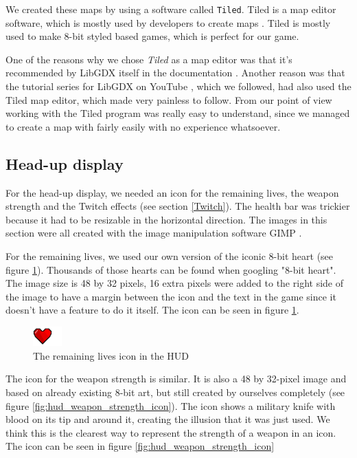 \documentclass[12p]{article}
\begin{document}
We created these maps by using a software called \texttt{Tiled}. Tiled is a map editor software, which is mostly used by developers to create maps \cite{TiledMapEditor}. Tiled is mostly used to make 8-bit styled based games, which is perfect for our game.

One of the reasons why we chose \emph{Tiled} as a map editor was that it's recommended by LibGDX itself in the documentation \cite{TileMaps}. Another reason was that the tutorial series for LibGDX on YouTube \cite{BrentAureliSuperMarioBros}, which we followed, had also used the Tiled map editor, which made very painless to follow. From our point of view working with the Tiled program was really easy to understand, since we managed to create a map with fairly easily with no experience whatsoever.

\subsection{Head-up display}

For the head-up display, we needed an icon for the remaining lives, the weapon strength and the Twitch effects (see section \ref{Twitch}). The health bar was trickier because it had to be resizable in the horizontal direction. The images in this section were all created with the image manipulation software GIMP \cite{GIMP}.

For the remaining lives, we used our own version of the iconic 8-bit heart (see figure \ref{fig:hud_heart_icon}). Thousands of those hearts can be found when googling "8-bit heart". The image size is 48 by 32 pixels, 16 extra pixels were added to the right side of the image to have a margin between the icon and the text in the game since it doesn't have a feature to do it itself. The icon can be seen in figure \ref{fig:hud_heart_icon}.

\begin{figure}[ht]
 \center
 \includegraphics[width=0.1\textwidth]{Documentation/heart_icon.png}
 \caption{The remaining lives icon in the HUD}
 \label{fig:hud_heart_icon}
\end{figure}

The icon for the weapon strength is similar. It is also a 48 by 32-pixel image and based on already existing 8-bit art, but still created by ourselves completely (see figure \ref{fig:hud_weapon_strength_icon}). The icon shows a military knife with blood on its tip and around it, creating the illusion that it was just used. We think this is the clearest way to represent the strength of a weapon in an icon. The icon can be seen in figure \ref{fig:hud_weapon_strength_icon}
\end{document}
